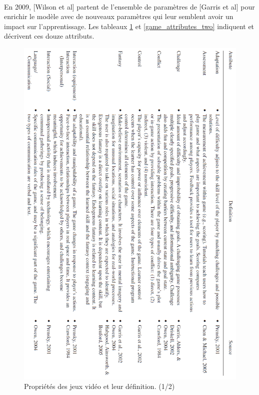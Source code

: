 \paragraph{}En 2009, [Wilson et al]\cite{Wils09} partent de l'ensemble de paramètres de [Garris et al] pour enrichir le modèle avec de nouveaux paramètres qui leur semblent avoir un impact sur l'apprentissage.
Les tableaux \ref{game_attributes_one} et \ref{game_attributes_two} indiquent et décrivent ces douze attributs.

\begin{figure}[h!]
	\centering
	\includegraphics[width=\linewidth, height=\textheight ]{images/game_attributes_one}
	\caption{Propriétés des jeux vidéo et leur définition. (1/2) \cite{Wils09}}
	\label{game_attributes_one}
\end{figure}
